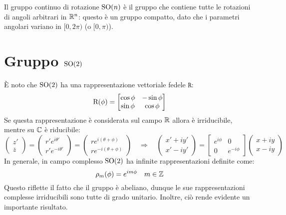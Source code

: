 
Il gruppo continuo di rotazione $ \mathrm{SO}(n) $ è il gruppo che contiene tutte le rotazioni di angoli arbitrari in $ \mathbb{R}^n $: questo è un gruppo compatto, dato che i parametri angolari variano in $ [0,2\pi) $ (o $ [0,\pi) $).

\section{Gruppo \texorpdfstring{$ \mathrm{SO}(2) $}{TEXT}}

È noto che $ \mathrm{SO}(2) $ ha una rappresentazione vettoriale fedele $ \mathtt{R} $:
\begin{equation}
	\mathrm{R}(\phi) =
	\begin{bmatrix}
		\cos \phi & -\sin \phi \\
		\sin \phi & \cos \phi
	\end{bmatrix}
	\label{eq:9.1}
\end{equation}
Se questa rappresentazione è considerata sul campo $ \mathbb{R} $ allora è irriducibile, mentre su $ \mathbb{C} $ è riducibile:
\begin{equation*}
	\begin{pmatrix}
		z' \\ \overline{z}
	\end{pmatrix}
	=
	\begin{pmatrix}
		r' e^{i\theta'} \\ r' e^{-i\theta'}
	\end{pmatrix}
	=
	\begin{pmatrix}
		r e^{i (\theta + \phi)} \\ r e^{-i(\theta + \phi)}
	\end{pmatrix}
	\quad \Rightarrow \quad
	\begin{pmatrix}
		x' + i y' \\ x' - i y'
	\end{pmatrix}
	=
	\begin{bmatrix}
		e^{i\phi} & 0 \\ 0 & e^{-i\phi}
	\end{bmatrix}
	\begin{pmatrix}
		x + i y \\ x - i y
	\end{pmatrix}
\end{equation*}
In generale, in campo complesso $ \mathrm{SO}(2) $ ha infinite rappresentazioni definite come:
\begin{equation}
	\rho_m(\phi) = e^{im\phi} \quad m\in\mathbb{Z}
	\label{eq:9.2}
\end{equation}
Questo riflette il fatto che il gruppo è abeliano, dunque le sue rappresentazioni complesse irriducibili sono tutte di grado unitario. Inoltre, ciò rende evidente un importante risultato.

